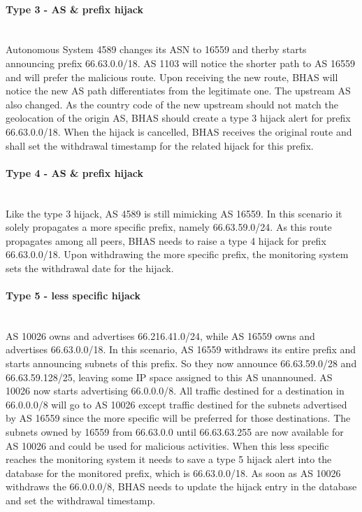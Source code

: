 \paragraph{Type 3 - AS \& prefix hijack}\label{par:asprefix}\mbox{}\\
Autonomous System 4589 changes its ASN to 16559 and therby starts announcing prefix 66.63.0.0/18. AS 1103 will notice the shorter path to AS 16559 and will prefer the malicious route. Upon receiving the new route, BHAS will notice the new AS path differentiates from the legitimate one. The upstream AS also changed. As the country code of the new upstream should not match the geolocation of the origin AS, BHAS should create a type 3 hijack alert for prefix 66.63.0.0/18. When the hijack is cancelled, BHAS receives the original route and shall set the withdrawal timestamp for the related hijack for this prefix.

\paragraph{Type 4 - AS \& prefix hijack}\label{par:assubnet}\mbox{}\\
Like the type 3 hijack, AS 4589 is still mimicking AS 16559. In this scenario it solely propagates a more specific prefix, namely 66.63.59.0/24. As this route propagates among all peers, BHAS needs to raise a type 4 hijack for prefix 66.63.0.0/18. Upon withdrawing the more specific prefix, the monitoring system sets the withdrawal date for the hijack.

\paragraph{Type 5 - less specific hijack}\label{par:lessspecific}\mbox{}\\
AS 10026 owns and advertises 66.216.41.0/24, while AS 16559 owns and advertises 66.63.0.0/18. In this scenario, AS 16559 withdraws its entire prefix and starts announcing subnets of this prefix. So they now announce 66.63.59.0/28 and 66.63.59.128/25, leaving some IP space assigned to this AS unannouned. AS 10026 now starts advertising 66.0.0.0/8. All traffic destined for a destination in 66.0.0.0/8 will go to AS 10026 except traffic destined for the subnets advertised by AS 16559 since the more specific will be preferred for those destinations. The subnets owned by 16559 from 66.63.0.0 until 66.63.63.255 are now available for AS 10026 and could be used for malicious activities. When this less specific reaches the monitoring system it needs to save a type 5 hijack alert into the database for the monitored prefix, which is 66.63.0.0/18. As soon as AS 10026 withdraws the 66.0.0.0/8, BHAS needs to update the hijack entry in the database and set the withdrawal timestamp.

